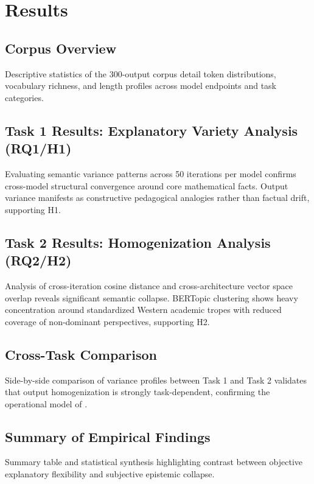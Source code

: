 
\chapter{Results}
\section{Corpus Overview}
Descriptive statistics of the 300-output corpus detail token distributions, vocabulary richness, and length profiles across model endpoints and task categories.

\section{Task 1 Results: Explanatory Variety Analysis (RQ1/H1)}
Evaluating semantic variance patterns across 50 iterations per model confirms cross-model structural convergence around core mathematical facts. Output variance manifests as constructive pedagogical analogies rather than factual drift, supporting H1.

\section{Task 2 Results: Homogenization Analysis (RQ2/H2)}
Analysis of cross-iteration cosine distance and cross-architecture vector space overlap reveals significant semantic collapse. BERTopic clustering shows heavy concentration around standardized Western academic tropes with reduced coverage of non-dominant perspectives, supporting H2.

\section{Cross-Task Comparison}
Side-by-side comparison of variance profiles between Task 1 and Task 2 validates that output homogenization is strongly task-dependent, confirming the operational model of \cite{Jain2025}.

\section{Summary of Empirical Findings}
Summary table and statistical synthesis highlighting contrast between objective explanatory flexibility and subjective epistemic collapse.
